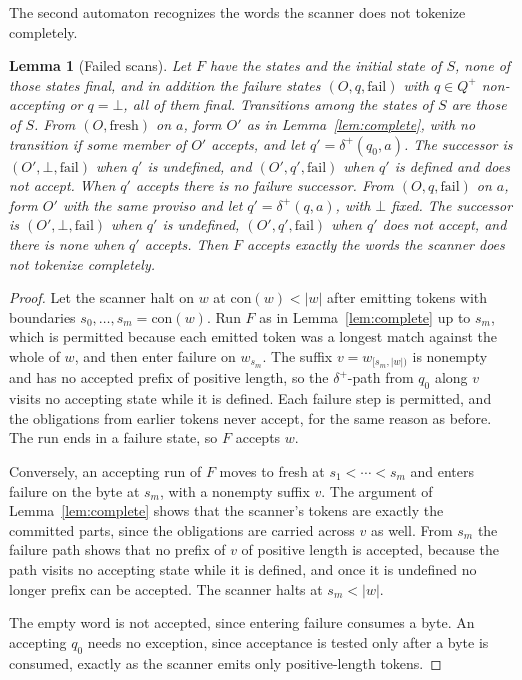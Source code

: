 \documentclass[11pt,a4paper]{article}
\theoremstyle{definition}
\theoremstyle{plain}
\newtheorem{lemma}{Lemma}
\begin{document}
The second automaton recognizes the words the scanner does not tokenize completely.

\begin{lemma}[Failed scans]
\label{lem:failed}
Let $F$ have the states and the initial state of $S$, none of those states final, and in addition the
\emph{failure states} $(O, q, \mathrm{fail})$ with $q \in Q^+$ non-accepting or $q = \bot$, all of them final.
Transitions among the states of $S$ are those of $S$. From $(O, \mathrm{fresh})$ on $a$, form $O'$ as in
Lemma~\ref{lem:complete}, with no transition if some member of $O'$ accepts, and let $q' = \delta^+(q_0, a)$. The
successor is $(O', \bot, \mathrm{fail})$ when $q'$ is undefined, and $(O', q', \mathrm{fail})$ when $q'$ is defined and
does not accept. When $q'$ accepts there is no failure successor. From $(O, q, \mathrm{fail})$ on $a$, form $O'$ with
the same proviso and let $q' = \delta^+(q, a)$, with $\bot$ fixed. The successor is $(O', \bot, \mathrm{fail})$ when
$q'$ is undefined, $(O', q', \mathrm{fail})$ when $q'$ does not accept, and there is none when $q'$ accepts. Then $F$
accepts exactly the words the scanner does not tokenize completely.
\end{lemma}

\begin{proof}
Let the scanner halt on $w$ at $\mathrm{con}(w) < |w|$ after emitting tokens with boundaries
$s_0, \ldots, s_m = \mathrm{con}(w)$. Run $F$ as in Lemma~\ref{lem:complete} up to $s_m$, which is permitted because
each emitted token was a longest match against the whole of $w$, and then enter failure on $w_{s_m}$. The suffix
$v = w_{[s_m, |w|)}$ is nonempty and has no accepted prefix of positive length, so the $\delta^+$-path from $q_0$ along
$v$ visits no accepting state while it is defined. Each failure step is permitted, and the obligations from earlier
tokens never accept, for the same reason as before. The run ends in a failure state, so $F$ accepts $w$.

Conversely, an accepting run of $F$ moves to fresh at $s_1 < \cdots < s_m$ and enters failure on the byte at $s_m$, with
a nonempty suffix $v$. The argument of Lemma~\ref{lem:complete} shows that the scanner's tokens are exactly the
committed parts, since the obligations are carried across $v$ as well. From $s_m$ the failure path shows that no prefix
of $v$ of positive length is accepted, because the path visits no accepting state while it is defined, and once it is
undefined no longer prefix can be accepted. The scanner halts at $s_m < |w|$.

The empty word is not accepted, since entering failure consumes a byte. An accepting $q_0$ needs no exception, since
acceptance is tested only after a byte is consumed, exactly as the scanner emits only positive-length tokens.
\end{proof}
\end{document}
